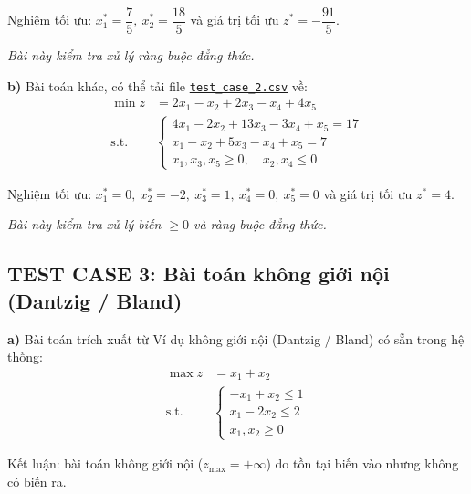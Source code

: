 \documentclass[12pt,a4paper]{article}
\begin{document}
Nghiệm tối ưu: $x_1^* = \dfrac{7}{5},\ x_2^* = \dfrac{18}{5}$ và giá trị tối ưu $z^* = -\dfrac{91}{5}$.

\textit{Bài này kiểm tra xử lý ràng buộc đẳng thức.}

\noindent \textbf{b)} Bài toán khác, có thể tải file \href{https://drive.google.com/uc?export=download&id=1O4QGTJxK5n-FU3EP5jCWbI_SLqUqUxHs}{\texttt{test\_case\_2.csv}} về:
\begin{equation*}
    \begin{aligned}
        \min z &= 2x_1 - x_2 + 2x_3 - x_4 + 4x_5 \\
        \text{s.t.} \quad
        &\begin{cases}
            4x_1 - 2x_2 + 13x_3 - 3x_4 + x_5 = 17 \\
            x_1  -  x_2 +  5x_3 -  x_4 + x_5 =  7 \\
            x_1, x_3, x_5 \geq 0,\quad x_2, x_4 \leq 0
        \end{cases}
    \end{aligned}
\end{equation*}

Nghiệm tối ưu: $x_1^* = 0,\ x_2^* = -2,\ x_3^* = 1,\ x_4^* = 0,\ x_5^* = 0$ và giá trị tối ưu $z^* = 4$.

\textit{Bài này kiểm tra xử lý biến $\geq 0$ và ràng buộc đẳng thức.}

\subsection*{TEST CASE 3: Bài toán không giới nội (Dantzig / Bland)}

\noindent \textbf{a)} Bài toán trích xuất từ \colorbox{green!30}{Ví dụ không giới nội (Dantzig / Bland)} có sẵn trong hệ thống:
\begin{equation*}
    \begin{aligned}
        \max z &= x_1 + x_2 \\
        \text{s.t.} \quad
        &\begin{cases}
            -x_1 + x_2 \leq 1 \\
             x_1 - 2x_2 \leq 2 \\
            x_1, x_2 \geq 0
        \end{cases}
    \end{aligned}
\end{equation*}

Kết luận: bài toán không giới nội ($z_{\max} = +\infty$) do tồn tại biến vào nhưng không có biến ra.
\end{document}

